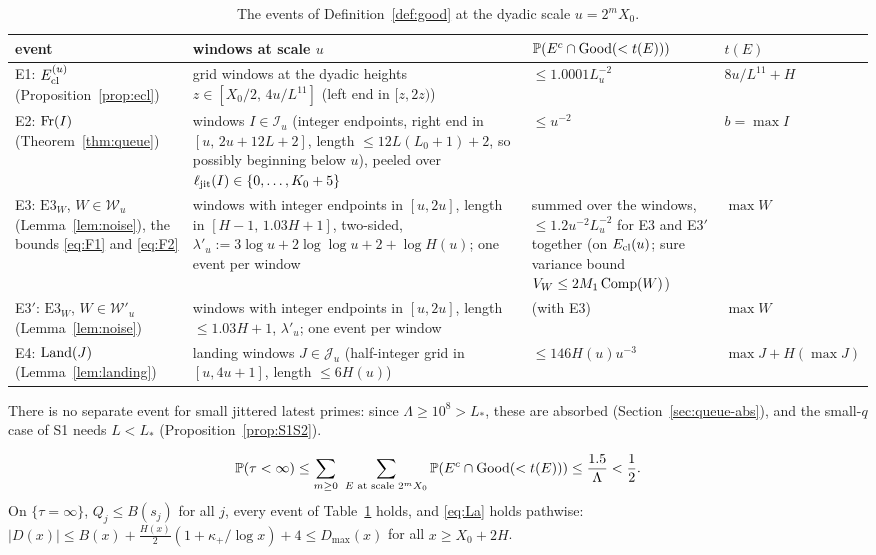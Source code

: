 \begin{table}[ht]
\centering\small
\renewcommand{\arraystretch}{1.25}
\begin{tabular}{@{}p{}p{}p{}p{}@{}}
\hline
event & windows at scale $u$ & $\mathbb{P}(E^c\cap\mathrm{Good}(<t(E)))$ & $t(E)$\\
\hline
E1: $E_{\mathrm{cl}}^{(u)}$ (Proposition~\ref{prop:ecl}) & grid windows at the dyadic heights $z\in[X_0/2,\,4u/L^{11}]$ (left end in $[z,2z)$) & $\le1.0001L_u^{-2}$ & $8u/L^{11}+H$\\
E2: $\mathrm{Fr}(I)$ (Theorem~\ref{thm:queue}) & windows $I\in\mathcal I_u$ (integer endpoints, right end in $[u,\,2u+12L+2]$, length
  $\le12L(L_0+1)+2$, so possibly beginning below $u$), peeled over $\ell_{\mathrm{jit}}(I)\in\{0,\dots,K_0+5\}$ & $\le u^{-2}$ & $b=\max I$\\
E3: $\mathrm{E3}_W$, $W\in\mathcal W_u$ (Lemma~\ref{lem:noise}), the bounds \eqref{eq:F1} and \eqref{eq:F2} & windows with integer
  endpoints in $[u,2u]$, length in $[H-1,\,1.03H+1]$, two-sided, $\lambda'_u:=3\log u+2\log\log u+2+\log H(u)$; one event per window
  & summed over the windows, $\le1.2u^{-2}L_u^{-2}$ for E3 and E3$'$ together (on $E_{\mathrm{cl}}(u)$; sure variance bound
  $V_W\le2M_1\operatorname{Comp}(W)$) & $\max W$\\
E3$'$: $\mathrm{E3}_W$, $W\in\mathcal W'_u$ (Lemma~\ref{lem:noise}) & windows with integer endpoints in $[u,2u]$, length
  $\le1.03H+1$, $\lambda'_u$; one event per window & (with E3) & $\max W$\\
E4: $\mathrm{Land}(J)$ (Lemma~\ref{lem:landing}) & landing windows $J\in\mathcal J_u$ (half-integer grid in $[u,4u+1]$, length
  $\le6H(u)$) & $\le146H(u)u^{-3}$ & $\max J+H(\max J)$\\
\hline
\end{tabular}
\caption{The events of Definition~\ref{def:good} at the dyadic scale $u=2^mX_0$.}\label{tab:events}
\end{table}

There is no separate event for small jittered latest primes: since $\Lambda\ge10^8>L_*$, these are absorbed (Section~\ref{sec:queue-abs}), and
the small-$q$ case of S1 needs $L<L_*$ (Proposition~\ref{prop:S1S2}).

\begin{lemma}\label{lem:budget}
\[
\Prob(\tau<\infty)\le\sum_{m\ge0}\ \sum_{E\text{ at scale }2^mX_0}\Prob(E^c\cap\Good(<t(E)))\le\frac{1.5}{\Lambda}<\frac12.
\]
On $\{\tau=\infty\}$, $Q_j\le B(s_j)$ for all $j$, every event of Table~\ref{tab:events} holds, and \eqref{eq:La} holds pathwise:
$|D(x)|\le B(x)+\tfrac{H(x)}2(1+\kappa_+/\log x)+4\le D_{\max}(x)$ for all $x\ge X_0+2H$.
\end{lemma}

